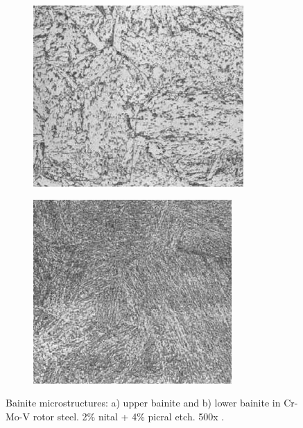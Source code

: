 \documentclass[12pt]{report}
\begin{document}
\begin{figure}[H]

\centering
\begin{subfigure}{.45\textwidth}
    \centering
    \includegraphics[height=.9\textwidth, width=\textwidth]{upper_bainite_microstruce.jpg}
    \caption{}
\end{subfigure}
\begin{subfigure}{.45\textwidth}
    \centering
    \includegraphics[height=.9\textwidth, width=\textwidth]{lower_bainite_microstructure.jpg}
    \caption{}
\end{subfigure}

\caption{Bainite microstructures: a) upper bainite and b) lower bainite in Cr-Mo-V rotor steel. 2\% nital + 4\% picral etch. 500x \cite{molabe2018determining}.}
\label{ch3:figure:bainite:microstructures}
\end{figure}
\end{document}
